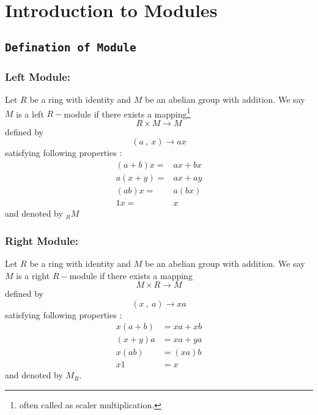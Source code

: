 \chapter{Introduction to Modules}
\section{\texttt{Defination of Module}}
\subsection{Left Module:}\label{sec:left-module}
 Let $ R $ be a ring with identity and $ M $ be an abelian group with addition. We say $ M $ is a left $R-$module if there exists a mapping\footnote{often called as scaler multiplication.}
\begin{equation*}
R \times M \rightarrow M
\end{equation*}	
defined by
\begin{equation*}
(a \ , \ x) \rightarrow ax
\end{equation*}
satisfying following properties :
\begin{align}
(a+b) x =& ax + bx \\ a(x+y) =& ax + ay \\ (ab)x =& a(bx) \\ 1x =& x
\end{align}
and denoted by $_{R}M$
\subsection{Right Module:}\label{sec:right-module}
Let $ R $ be a ring with identity and $ M $ be an abelian group with addition. We say $ M $ is a right $R-$module if there exists a mapping
\begin{equation*}
M \times R \rightarrow M
\end{equation*}	
defined by
\begin{equation*}
(x \ ,\ a) \rightarrow xa
\end{equation*}
 satisfying following properties :
\begin{align}
x (a+b)  &= xa + xb \\ (x+y) a &= xa + ya \\ x (ab) &= (xa)b \\ x1 &= x
\end{align}
and denoted by $M_{R}$.

